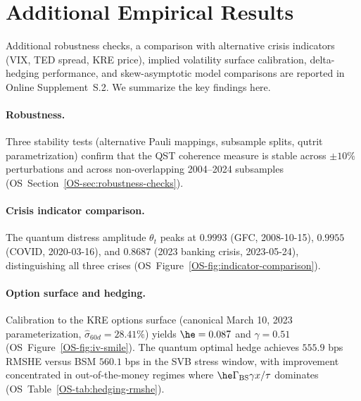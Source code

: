 
\section{Additional Empirical Results}\label{sec:additional-results}

Additional robustness checks, a comparison with alternative crisis indicators
(VIX, TED spread, KRE price), implied volatility surface calibration,
delta-hedging performance, and skew-asymptotic model
comparisons are reported in Online Supplement~S.2. We summarize the
key findings here.

\paragraph{Robustness.} Three stability tests (alternative Pauli mappings, subsample
splits, qutrit parametrization) confirm that the QST coherence measure is stable
across $\pm 10\%$ perturbations and across non-overlapping 2004--2024 subsamples
(OS~Section~\ref{OS-sec:robustness-checks}).

\paragraph{Crisis indicator comparison.} The quantum distress amplitude $\theta_t$
peaks at $0.9993$ (GFC, 2008-10-15), $0.9955$ (COVID, 2020-03-16), and $0.8687$
(2023 banking crisis, 2023-05-24), distinguishing all three crises
(OS~Figure~\ref{OS-fig:indicator-comparison}).

\paragraph{Option surface and hedging.} Calibration to the KRE options surface
(canonical March 10, 2023 parameterization, $\hat\sigma_{60d} = 28.41\%$) yields
$\he = 0.087$ and $\gamma = 0.51$ (OS~Figure~\ref{OS-fig:iv-smile}). The quantum optimal hedge
achieves $555.9$ bps RMSHE versus BSM $560.1$ bps in the SVB stress window, with
improvement concentrated in out-of-the-money regimes where
$\he\Gamma_{\text{BS}}\gamma x/\tau$ dominates (OS~Table~\ref{OS-tab:hedging-rmshe}).
